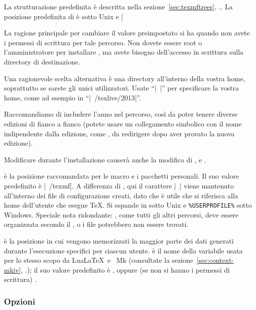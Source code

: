 \documentclass{article}
\begin{document}
La strutturazione predefinita è descritta nella
sezione~\ref{sec:texmftrees}, \p.\pageref{sec:texmftrees}. La posizione
predefinita di  è  sotto
Unix e |%

La ragione principale per cambiare il valore preimpostato si ha quando non
avete i permessi di scrittura per tale percorso. Non dovete essere root o
l'amministratore per installare \TL, ma avete bisogno dell'accesso in
scrittura sulla directory di destinazione.

Una ragionevole scelta alternativa è una directory all'interno della
vostra home, soprattutto se sarete gli unici utilizzatori. Usate ``|~|''
per specificare la vostra home, come ad esempio in ``|~/texlive/2013|''.

Raccomandiamo di includere l'anno nel percorso, così da poter tenere
diverse edizioni di \TL{} fianco a fianco (potete usare un collegamento
simbolico con il nome indipendente dalla edizione, come
, da redirigere dopo aver provato la nuova
edizione).

Modificare  durante l'installazione causerà anche la
modifica di ,  e
.

 è la posizione raccomandata per le macro e i pacchetti
personali. Il suo valore predefinito è |~/texmf|. A differenza di
, qui il carattere |~| viene mantenuto all'interno dei
file di configurazione creati, dato che è utile che si riferisca alla home
dell'utente che esegue \TeX. Si espande in  sotto
Unix e \verb|%USERPROFILE%| sotto Windows. Speciale nota ridondante:
, come tutti gli altri percorsi, deve essere organizzata
secondo il \TDS, o i file potrebbero non essere trovati. %

 è la posizione in cui vengono memorizzati la maggior
parte dei dati generati durante l'esecuzione specifici per ciascun utente.
 è il nome della variabile usata per lo stesso scopo da
Lua\LaTeX\ e \ConTeXt\ Mk (consultate la
sezione~\ref{sec:context-mkiv}, \p.\pageref{sec:context-mkiv}); il suo
valore predefinito è , oppure (se non si hanno i
permessi di scrittura) .


\subsubsection{Opzioni}
\label{sec:options}
\end{document}
